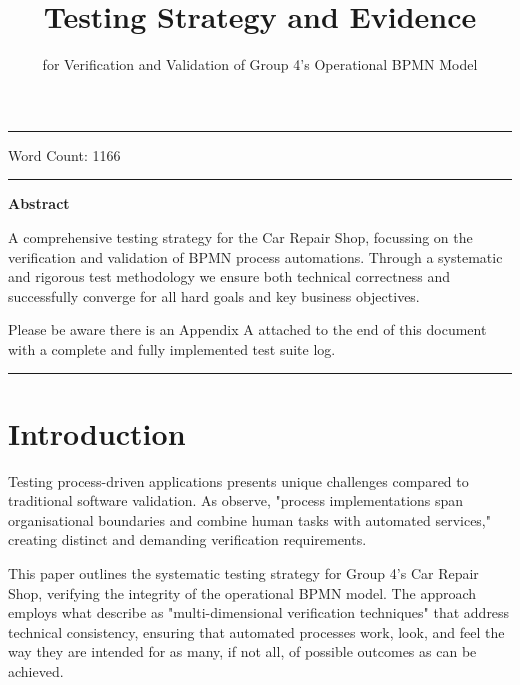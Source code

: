 \documentclass[14pt,a4paper]{article}
\title{Testing Strategy and Evidence}
\author{for Verification and Validation of Group 4's Operational BPMN Model}
\date{}
\begin{document}
\maketitle

\hrule

\vspace{3em}

Word Count: 1166

\vspace{3em}
\hrule

\vspace{2em}
\textbf{Abstract}
\vspace{1em}

A comprehensive testing strategy for the Car Repair Shop, focussing on the verification and validation of BPMN process automations. Through a systematic and rigorous test methodology we ensure both technical correctness and successfully converge for all hard goals and key business objectives.

Please be aware there is an Appendix A attached to the end of this document with a complete and fully implemented test suite log.

\vspace{3em}
\hrule

\thispagestyle{empty}

\tableofcontents
{}

\newpage


\section{Introduction}

Testing process-driven applications presents unique challenges compared to traditional software validation. As \textit{\parencite[p. 127]{Bozkurt2013}} observe, "process implementations span organisational boundaries and combine human tasks with automated services," creating distinct and demanding verification requirements.

This paper outlines the systematic testing strategy for Group 4's Car Repair Shop, verifying the integrity of the operational BPMN model. The approach employs what \textit{\parencite[p. 219]{Giray2016}} describe as "multi-dimensional verification techniques" that address technical consistency, ensuring that automated processes work, look, and feel the way they are intended for as many, if not all, of possible outcomes as can be achieved.
\end{document}
